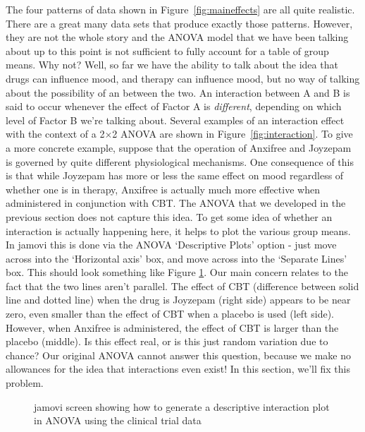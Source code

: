 The four patterns of data shown in Figure~\ref{fig:maineffects} are all quite realistic. There are a great many data sets that produce exactly those patterns. However, they are not the whole story and the ANOVA model that we have been talking about up to this point is not sufficient to fully account for a table of group means. Why not? Well, so far we have the ability to talk about the idea that drugs can influence mood, and therapy can influence mood, but no way of talking about the possibility of an  between the two. An interaction between A and B is said to occur whenever the effect of Factor A is {\it different}, depending on which level of Factor B we're talking about. Several examples of an interaction effect with the context of a 2$\times$2 ANOVA are shown in Figure~\ref{fig:interaction}. To give a more concrete example, suppose that the operation of Anxifree and Joyzepam is governed by quite different physiological mechanisms. One consequence of this is that while Joyzepam has more or less the same effect on mood regardless of whether one is in therapy, Anxifree is actually much more effective when administered in conjunction with CBT. The ANOVA that we developed in the previous section does not capture this idea. To get some idea of whether an interaction is actually happening here, it helps to plot the various group means. In jamovi this is done via the ANOVA `Descriptive Plots' option - just move  across into the `Horizontal axis' box, and move  across into the `Separate Lines' box. This should look something like Figure \ref{fig:interactionplot}. Our main concern relates to the fact that the two lines aren't parallel. The effect of CBT (difference between solid line and dotted line) when the drug is Joyzepam (right side) appears to be near zero, even smaller than the effect of CBT when a placebo is used (left side). However, when Anxifree is administered, the effect of CBT is larger than the placebo (middle). Is this effect real, or is this just random variation due to chance? Our original ANOVA cannot answer this question, because we make no allowances for the idea that interactions even exist! In this section, we'll fix this problem.

\vspace{0.5cm}
\begin{figure}[!htb]
\begin{center}
\caption{jamovi screen showing how to generate a descriptive interaction plot in ANOVA using the clinical trial data}
\label{fig:interactionplot}
\HR
\end{center}
\end{figure}

